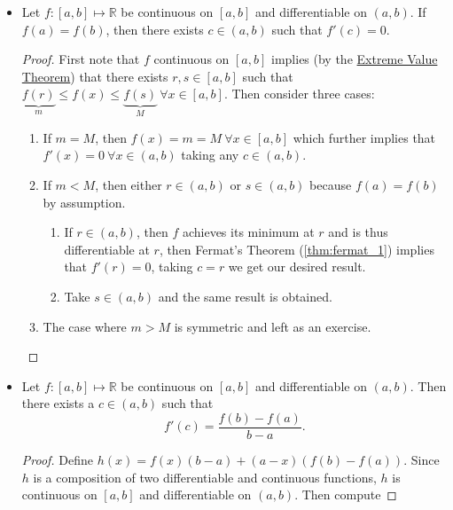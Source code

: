 \documentclass{article}
\newcommand{\R}{\mathbb{R}}
\newcommand{\?}{\stackrel{?}{=}}
\theoremstyle{definition} %
\begin{document}
\begin{itemize}
    \item[]
    \begin{theorem}
        Let $f: [a, b] \mapsto \R$ be continuous on $[a, b]$ and differentiable on $(a, b)$. If $f(a) = f(b)$, then there exists $c \in (a, b)$ such that $f'(c) = 0$.
        \label{thm:rolles}
    \end{theorem}
    \begin{proof}
        First note that $f$ continuous on $[a, b]$ implies (by the \hyperref[thm:evt]{Extreme Value Theorem}) that there exists $r, s \in [a, b]$ such that $\underbrace{f(r)}_{m} \leq f(x) \leq \underbrace{f(s)}_{M} \ \forall x \in [a, b]$. Then consider three cases:
        \begin{enumerate}[label=(\arabic*)]
            \item If $m = M$, then $f(x) = m = M \ \forall x \in [a, b]$ which further implies that $f'(x) = 0 \ \forall x \in (a, b)$ taking any $c \in (a, b)$.
            \item If $m < M$, then either $r \in (a, b)$ or $s \in (a, b)$ because $f(a) = f(b)$ by assumption.
            \begin{enumerate}[label=(\roman*)]
                \item If $r \in (a, b)$, then $f$ achieves its minimum at $r$ and is thus differentiable at $r$, then Fermat's Theorem (\ref{thm:fermat_1}) implies that $f'(r) = 0$, taking $c = r$ we get our desired result.
                \item Take $s \in (a, b)$ and the same result is obtained.
            \end{enumerate}
            \item The case where $m > M$ is symmetric and left as an exercise.
        \end{enumerate}
    \end{proof}
    \item[]
    \begin{theorem}
        Let $f: [a, b] \mapsto \R$ be continuous on $[a, b]$ and differentiable on $(a, b)$. Then there exists a $c \in (a, b)$ such that
        $$f'(c) = \frac{f(b) - f(a)}{b - a}.$$
        \label{thm:mvt}
    \end{theorem}
    \begin{proof}
        Define $h(x) = f(x)(b - a) + (a- x)(f(b) - f(a))$. Since $h$ is a composition of two differentiable and continuous functions, $h$ is continuous on $[a, b]$ and differentiable on $(a, b)$. Then compute

\end{proof}
\end{itemize}
\end{document}
